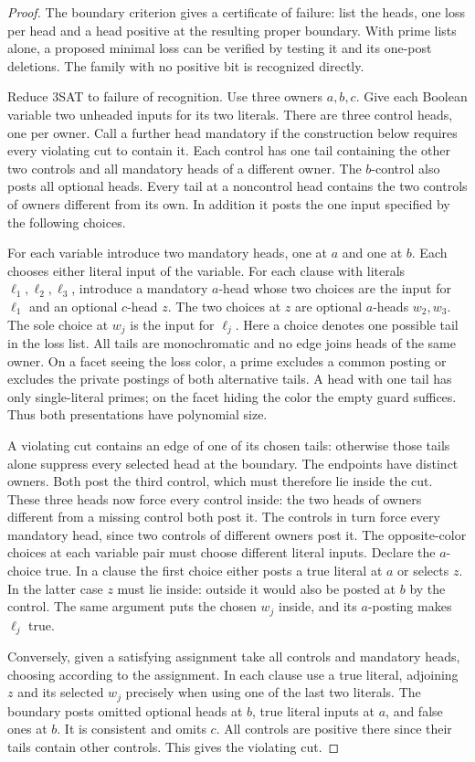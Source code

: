 \begin{proof}
The boundary criterion gives a certificate of failure: list the heads,
one loss per head and a head positive at the resulting proper boundary.
With prime lists alone, a proposed minimal loss can be verified by
testing it and its one-post deletions. The family with no positive bit
is recognized directly.

Reduce 3SAT to failure of recognition. Use three owners $a,b,c$.
Give each Boolean variable two unheaded inputs for its two literals.
There are three control heads, one per owner. Call a further head
mandatory if the construction below requires every violating cut to
contain it. Each control has one tail containing the other two
controls and all mandatory heads of a different owner. The $b$-control
also posts all optional heads. Every tail at a noncontrol head contains
the two controls of owners different from its own. In addition it
posts the one input specified by the following choices.

For each variable introduce two mandatory heads, one at $a$ and one
at $b$. Each chooses either literal input of the variable.
For each clause with literals $\ell_1,\ell_2,\ell_3$, introduce a
mandatory $a$-head whose two choices are the input for $\ell_1$ and
an optional $c$-head $z$. The two choices at $z$ are optional
$a$-heads $w_2,w_3$. The sole choice at $w_j$ is the input for
$\ell_j$. Here a choice denotes one possible tail in the loss list.
All tails are monochromatic and no edge joins heads of the same
owner. On a facet seeing the loss color, a prime excludes a common
posting or excludes the private postings of both alternative tails.
A head with one tail has only single-literal primes; on the facet
hiding the color the empty guard suffices. Thus both presentations
have polynomial size.

A violating cut contains an edge of one of its chosen tails: otherwise
those tails alone suppress every selected head at the boundary.
The endpoints have distinct owners. Both post the third control, which
must therefore lie inside the cut. These three heads now force every
control inside: the two heads of owners different from a missing
control both post it. The controls in turn force every mandatory head,
since two controls of different owners post it. The opposite-color
choices at each variable pair must choose different literal inputs.
Declare the $a$-choice true. In a clause the first choice either
posts a true literal at $a$ or selects $z$. In the latter case $z$
must lie inside: outside it would also be posted at $b$ by the
control. The same argument puts the chosen $w_j$ inside, and its
$a$-posting makes $\ell_j$ true.

Conversely, given a satisfying assignment take all controls and
mandatory heads, choosing according to the assignment. In each clause
use a true literal, adjoining $z$ and its selected $w_j$ precisely
when using one of the last two literals. The boundary posts omitted
optional heads at $b$, true literal inputs at $a$, and false ones
at $b$. It is consistent and omits $c$. All controls are positive
there since their tails contain other controls. This gives the
violating cut.
\end{proof}

